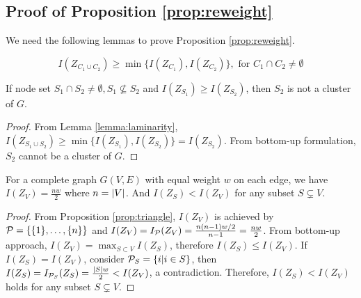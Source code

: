 \subsection{Proof of Proposition \ref{prop:reweight}}
We need the following lemmas to prove Proposition \ref{prop:reweight}.
\begin{lemma}\label{lemma:laminarity}
	\begin{equation}\label{eq:P}
	I(Z_{C_1 \cup C_2}) \geq \min\{ I(Z_{C_1}), I(Z_{C_2})\}, \textrm{ for } C_1\cap C_2 \neq \emptyset
	\end{equation}
\end{lemma}
\begin{lemma}\label{lemma:sub}
	If node set $S_1 \cap S_2 \neq \emptyset, S_1 \not\subseteq S_2$ and $I(Z_{S_1}) \geq I(Z_{S_2})$, then $S_2$ is not a cluster of $G$.
\end{lemma}
\begin{proof}
	From Lemma \ref{lemma:laminarity},
	$I(Z_{S_1\cup S_2}) \geq \min\{I(Z_{S_1}), I(Z_{S_2})\} = I(Z_{S_2})$. From bottom-up formulation,  $S_2$ cannot be a cluster of $G$.
\end{proof}
\begin{corollary}\label{cor:complete}
	For a complete graph $G(V,E)$ with equal weight $w$ on each edge, we have $I(Z_{V})=\frac{nw}{2}$ where $n=\abs{V}$. And $I(Z_S) < I(Z_V)$ for any subset $S\subsetneq V$.
\end{corollary}
\begin{proof}
	From Proposition \ref{prop:triangle}, $I(Z_{V})$ is achieved by $\P=\{\{1\},\dots,\{n\} \}$ and $I(Z_V) = I_{\P}(Z_V) = \frac{n(n-1)w/2}{n-1} = \frac{nw}{2} $. From bottom-up approach, $I(Z_V) = \max_{S\subset V} I(Z_S)$, therefore $I(Z_S) \leq I(Z_V)$. If $I(Z_S) = I(Z_V)$, consider $\P_S=\{i | i \in S\}$, then $I(Z_S) = I_{\P_S}(Z_S) = \frac{\abs{S}w}{2} < I(Z_V)$, a contradiction. Therefore, $I(Z_S) < I(Z_V)$ holds for any subset $S\subsetneq V$.
\end{proof}
